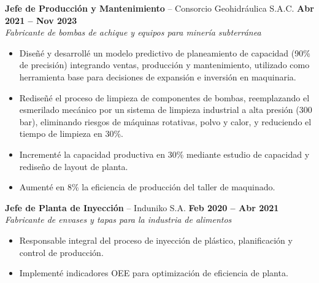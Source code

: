 \documentclass[10pt,a4paper]{article}
\begin{document}
\textbf{Jefe de Producci\'on y Mantenimiento} -- Consorcio Geohidr\'aulica S.A.C. \hfill \textbf{Abr 2021 -- Nov 2023}\\
\textit{Fabricante de bombas de achique y equipos para miner\'ia subterr\'anea}
\begin{itemize}
  \item Dise\~n\'e y desarroll\'e un modelo predictivo de planeamiento de capacidad (90\% de precisi\'on) integrando ventas, producci\'on y mantenimiento, utilizado como herramienta base para decisiones de expansi\'on e inversi\'on en maquinaria.
  \item Redise\~n\'e el proceso de limpieza de componentes de bombas, reemplazando el esmerilado mec\'anico por un sistema de limpieza industrial a alta presi\'on (300 bar), eliminando riesgos de m\'aquinas rotativas, polvo y calor, y reduciendo el tiempo de limpieza en 30\%.
  \item Increment\'e la capacidad productiva en 30\% mediante estudio de capacidad y redise\~no de layout de planta.
  \item Aument\'e en 8\% la eficiencia de producci\'on del taller de maquinado.
\end{itemize}

\textbf{Jefe de Planta de Inyecci\'on} -- Induniko S.A. \hfill \textbf{Feb 2020 -- Abr 2021}\\
\textit{Fabricante de envases y tapas para la industria de alimentos}
\begin{itemize}
  \item Responsable integral del proceso de inyecci\'on de pl\'astico, planificaci\'on y control de producci\'on.
  \item Implement\'e indicadores OEE para optimizaci\'on de eficiencia de planta.
\end{itemize}
\end{document}
